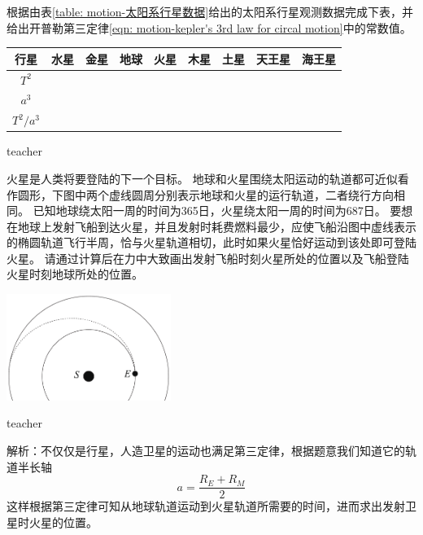 \begin{example}
根据由表\ref{table: motion-太阳系行星数据}给出的太阳系行星观测数据完成下表，并给出开普勒第三定律\ref{eqn: motion-kepler's 3rd law for circal motion}中的常数值。
\begin{center}
\begin{tabular}{|c|c|c|c|c|c|c|c|c|}
\hline 
行星 & 水星 & 金星 & 地球 & 火星 & 木星 & 土星 & 天王星 & 海王星  \\ 
\hline 
$T^2$ &   &   &   &   &   &   &   &  	 \\ 
\hline 
$a^3$ &   &   &   &   &   &   &   &   \\ 
\hline 
$T^2/a^3$ &   &   &   &   &   &   &   &   \\ 
\hline 
\end{tabular} 
\end{center}

\begin{taggedblock}{teacher}


\end{taggedblock}
\end{example}

\begin{example}
火星是人类将要登陆的下一个目标。
地球和火星围绕太阳运动的轨道都可近似看作圆形，下图中两个虚线圆周分别表示地球和火星的运行轨道，二者绕行方向相同。
已知地球绕太阳一周的时间为365日，火星绕太阳一周的时间为687日。
要想在地球上发射飞船到达火星，并且发射时耗费燃料最少，应使飞船沿图中虚线表示的椭圆轨道飞行半周，恰与火星轨道相切，此时如果火星恰好运动到该处即可登陆火星。
请通过计算后在力中大致画出发射飞船时刻火星所处的位置以及飞船登陆火星时刻地球所处的位置。
\begin{flushright}
\includegraphics[width=0.4\textwidth]{images/motion-problem-38.pdf}
\end{flushright}
\begin{taggedblock}{teacher}


\vspace*{4cm}
\noindent
解析：不仅仅是行星，人造卫星的运动也满足第三定律，根据题意我们知道它的轨道半长轴
\[a = \frac{R_E+R_M}{2}\]
这样根据第三定律可知从地球轨道运动到火星轨道所需要的时间，进而求出发射卫星时火星的位置。

\end{taggedblock}
\end{example}










